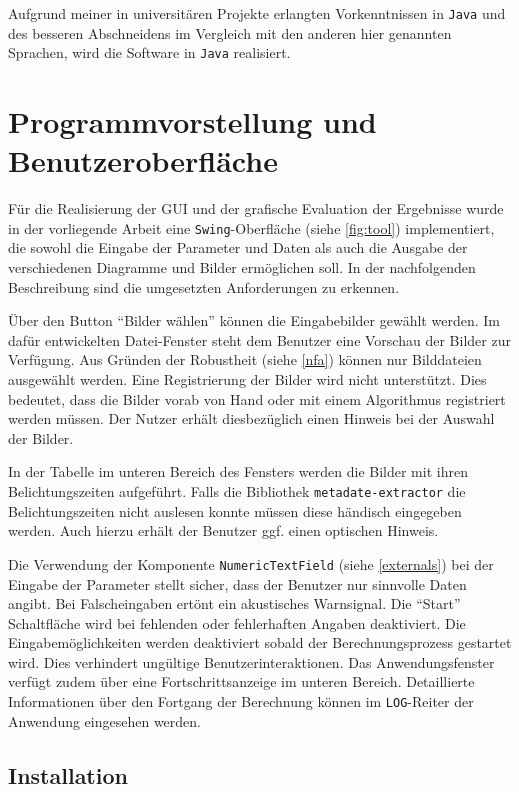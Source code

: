 Aufgrund meiner in universitären Projekte erlangten Vorkenntnissen in \texttt{Java} und des besseren Abschneidens im Vergleich mit den anderen hier genannten Sprachen, wird die Software in \texttt{Java} realisiert.


\section{Programmvorstellung und Benutzeroberfläche}

Für die Realisierung der \gls{GUI} und der grafische Evaluation der Ergebnisse wurde in der vorliegende Arbeit eine \texttt{Swing}-Oberfläche (siehe \autoref{fig:tool}) implementiert, die sowohl die Eingabe der Parameter und Daten als auch die Ausgabe der verschiedenen Diagramme und Bilder ermöglichen soll. In der nachfolgenden Beschreibung sind die umgesetzten Anforderungen zu erkennen.

Über den Button \enquote{Bilder wählen} können die Eingabebilder gewählt werden. Im dafür entwickelten Datei-Fenster steht dem Benutzer eine Vorschau der Bilder zur Verfügung. Aus Gründen der Robustheit (siehe \autoref{nfa}) können nur Bilddateien ausgewählt werden.  Eine Registrierung der Bilder wird nicht unterstützt. Dies bedeutet, dass die Bilder vorab von Hand oder mit einem Algorithmus registriert werden müssen. Der Nutzer erhält diesbezüglich einen Hinweis bei der Auswahl der Bilder.

In der Tabelle im unteren Bereich des Fensters werden die Bilder mit ihren Belichtungszeiten aufgeführt. Falls die Bibliothek \texttt{metadate-extractor} die Belichtungszeiten nicht auslesen konnte müssen diese händisch eingegeben werden. Auch hierzu erhält der Benutzer ggf. einen optischen Hinweis.

Die Verwendung der Komponente \texttt{NumericTextField} (siehe \autoref{externals}) bei der Eingabe der Parameter stellt sicher, dass der Benutzer nur sinnvolle Daten angibt. Bei Falscheingaben ertönt ein akustisches Warnsignal. Die \enquote{Start} Schaltfläche wird bei fehlenden oder fehlerhaften Angaben deaktiviert. Die Eingabemöglichkeiten werden deaktiviert sobald der Berechnungsprozess gestartet wird. Dies verhindert ungültige Benutzerinteraktionen. Das Anwendungsfenster verfügt zudem über eine Fortschrittsanzeige im unteren Bereich. Detaillierte Informationen über den Fortgang der Berechnung können im \texttt{LOG}-Reiter der Anwendung eingesehen werden.

\subsection{Installation}

